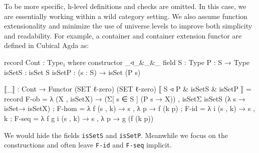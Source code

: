 To be more specific, h-level definitions and checks are omitted. In this case, we are essentially working within a wild category setting. We also assume function extensionality and minimize the use of universe levels to improve both simplicity and readability. For example, a container and container extension functor are defined in Cubical Agda as:

\begin{code}
record Cont : Type₁ where
  constructor _◃_&_&_
  field
    S : Type
    P : S → Type
    isSetS : isSet S
    isSetP : (s : S) → isSet (P s)

⟦_⟧ : Cont → Functor (SET ℓ-zero) (SET ℓ-zero)
⟦ S ◃ P & isSetS & isSetP ⟧
  = record
  { F-ob = λ (X , isSetX) → 
    (Σ[ s ∈ S ] (P s → X)) , isSetΣ isSetS (λ s → isSet→ isSetX)
  ; F-hom = λ f (s , k) → s , λ p → f (k p)
  ; F-id = λ i (s , k) → s , k
  ; F-seq = λ f g i (s , k) → s , λ p → g (f (k p))
  }
\end{code}

We would hide the fields \texttt{isSetS} and \texttt{isSetP}. Meanwhile we focus on the constructions and often leave \texttt{F-id} and \texttt{F-seq} implicit.